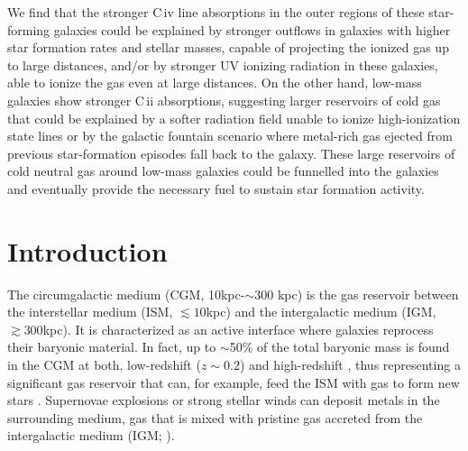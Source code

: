 \documentclass[longauth]{aa}
\begin{document}
   {We find that the stronger C\,{\sc iv} line absorptions in the outer
   regions of these {star-forming} galaxies could be explained by stronger
   outflows in galaxies with higher star formation rates and stellar masses,
   capable of projecting the ionized gas up to large distances, and/or by
   stronger UV ionizing radiation in these galaxies, able to ionize the gas
   even at large distances. On the other hand, low-mass galaxies show
   stronger C\,{\sc ii} absorptions, suggesting larger reservoirs of cold gas
   that could be explained by a softer radiation field unable to ionize
   high-ionization state lines or by the galactic fountain scenario where
   metal-rich gas ejected from previous star-formation episodes fall back to
   the galaxy. These large reservoirs of cold neutral gas around low-mass
   galaxies could be funnelled into the galaxies and eventually provide the
   necessary fuel to sustain star formation activity.}

   \maketitle
%
\section{Introduction}
\noindent
The circumgalactic medium (CGM, 10kpc-$\sim$300 kpc) is the gas reservoir
between the interstellar medium (ISM, {$\lesssim10$kpc}) and the
intergalactic medium (IGM, $\gtrsim300$kpc). It is characterized as an active
interface where galaxies reprocess their baryonic material. In fact, up to
$\sim$50\% of the total baryonic mass is found in the CGM at both,
low-redshift ($z\sim0.2$) \citep{Wolfe05,Werk14,Zheng15} and
high-redshift \citep{Hafen19}, thus representing a significant gas reservoir
that can, for example, feed the ISM with gas to form new stars \citep
{Zhu13a,Thom12,Richter16}. Supernovae explosions or strong stellar winds can
deposit metals in the surrounding medium, gas that is mixed with pristine gas
accreted from the intergalactic medium (IGM; \citealt
{Prochaska09,Bauermeister10,Tumlinson11a,Tumlinson17,Kacprzak17}).
\end{document}
